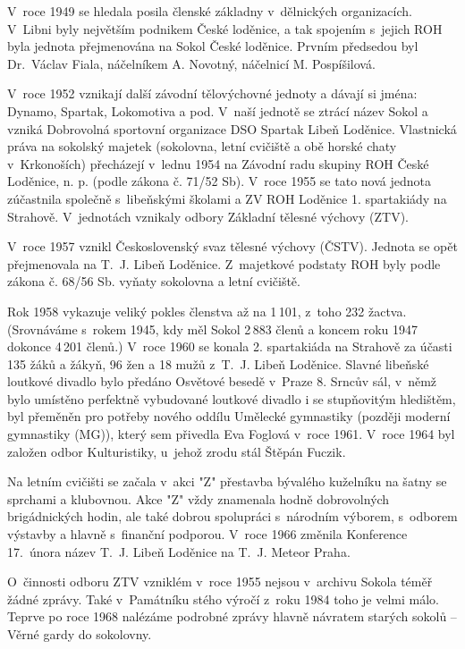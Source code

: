 \documentclass[a5paper, 11pt, twoside]{article}
\begin{document}
{\sloppy V~roce 1949 se hledala posila členské základny v~dělnických
organizacích. V~Libni byly největším podnikem České loděnice, a tak
spojením s~jejich ROH byla jednota přejmenována na Sokol České loděnice.
Prvním předsedou byl Dr.~Václav Fiala, náčelníkem A. Novotný, náčelnicí
M. Pospíšilová.\par}

V~roce 1952 vznikají další závodní tělovýchovné jednoty a dávají si
jména: Dynamo, Spartak, Lokomotiva a pod. V~naší jednotě se ztrácí název
Sokol a vzniká Dobrovolná sportovní organizace DSO Spartak Libeň
Loděnice. Vlastnická práva na sokolský majetek (sokolovna, letní
cvičiště a obě horské chaty v~Krkonoších) přecházejí v~lednu 1954 na
Závodní radu skupiny ROH České Loděnice, n. p. (podle zákona č. 71/52
Sb). V~roce 1955 se tato nová jednota zúčastnila společně s~libeňskými
školami a ZV ROH Loděnice 1. spartakiády na Strahově. V~jednotách
vznikaly odbory Základní tělesné výchovy (ZTV).

V~roce 1957 vznikl Československý svaz tělesné výchovy (ČSTV). Jednota
se opět přejmenovala na T.~J. Libeň Loděnice. Z~majetkové podstaty ROH
byly podle zákona č. 68/56 Sb. vyňaty sokolovna a letní cvičiště.

Rok 1958 vykazuje veliký pokles členstva až na 1\,101, z~toho 232 žactva.
(Srovnáváme s~rokem 1945, kdy měl Sokol 2\,883 členů a koncem roku 1947
dokonce 4\,201 členů.) V~roce 1960 se konala 2. spartakiáda na Strahově
za účasti 135 žáků a žákyň, 96 žen a 18 mužů z~T.~J. Libeň Loděnice.
Slavné libeňské loutkové divadlo bylo předáno Osvětové besedě v~Praze 8.
Srncův sál, v~němž bylo umístěno perfektně vybudované loutkové divadlo i
se stupňovitým hledištěm, byl přeměněn pro potřeby nového oddílu
Umělecké gymnastiky (později moderní gymnastiky (MG)), který sem
přivedla Eva Foglová v~roce 1961. V~roce 1964 byl založen odbor
Kulturistiky, u~jehož zrodu stál Štěpán Fuczik.

Na letním cvičišti se začala v~akci "Z" přestavba bývalého kuželníku na
šatny se sprchami a klubovnou. Akce "Z" vždy znamenala hodně
dobrovolných brigádnických hodin, ale také dobrou spolupráci s~národním
výborem, s~odborem výstavby a hlavně s~finanční podporou. V~roce 1966
změnila Konference 17.~února název T.~J. Libeň Loděnice na T.~J. Meteor
Praha.

O~činnosti odboru ZTV vzniklém v~roce 1955 nejsou v~archivu Sokola téměř
žádné zprávy. Také v~Památníku stého výročí z~roku 1984 toho je velmi
málo. Teprve po roce 1968 nalézáme podrobné zprávy hlavně návratem
starých sokolů -- Věrné gardy do sokolovny.
\end{document}
